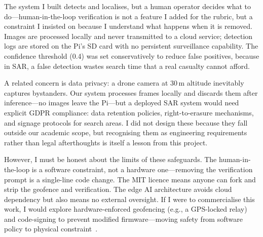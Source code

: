 The system I built detects and localises, but a human operator decides what to do---human-in-the-loop verification is not a feature I added for the rubric, but a constraint I insisted on because I understand what happens when it is removed. Images are processed locally and never transmitted to a cloud service; detection logs are stored on the Pi's SD card with no persistent surveillance capability. The confidence threshold (0.4) was set conservatively to reduce false positives, because in SAR, a false detection wastes search time that a real casualty cannot afford.

A related concern is data privacy: a drone camera at 30\,m altitude inevitably captures bystanders. Our system processes frames locally and discards them after inference---no images leave the Pi---but a deployed SAR system would need explicit GDPR compliance: data retention policies, right-to-erasure mechanisms, and signage protocols for search areas. I did not design these because they fall outside our academic scope, but recognising them as engineering requirements rather than legal afterthoughts is itself a lesson from this project.

However, I must be honest about the limits of these safeguards. The human-in-the-loop is a software constraint, not a hardware one---removing the verification prompt is a single-line code change. The MIT licence means anyone can fork and strip the geofence and verification. The edge AI architecture avoids cloud dependency but also means no external oversight. If I were to commercialise this work, I would explore hardware-enforced geofencing (e.g., a GPS-locked relay) and code-signing to prevent modified firmware---moving safety from software policy to physical constraint~\cite{leveson2011}.
